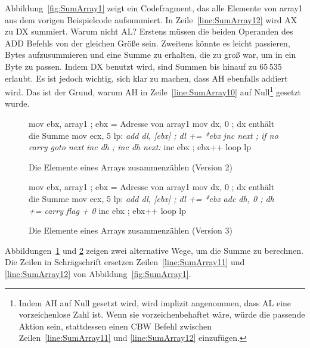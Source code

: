 Abbildung~\ref{fig:SumArray1} zeigt ein Codefragment, das alle
Elemente von {\code array1} aus dem vorigen Beispielcode
aufsummiert. In Zeile~\ref{line:SumArray12} wird AX zu DX summiert.
Warum nicht AL? Erstens m\"{u}ssen die beiden Operanden des {\code ADD}
Befehls von der gleichen Gr\"{o}{\ss}e sein. Zweitens k\"{o}nnte es leicht
passieren, Bytes aufzusummieren und eine Summe zu erhalten, die zu
gro{\ss} war, um in ein Byte zu passen. Indem DX benutzt wird, sind
Summen bis hinauf zu 65\,535 erlaubt. Es ist jedoch wichtig, sich
klar zu machen, dass AH ebenfalls addiert wird. Das ist der Grund,
warum AH in Zeile~\ref{line:SumArray10} auf Null\footnote{Indem AH
auf Null gesetzt wird, wird implizit angenommen, dass AL eine
vorzeichenlose Zahl ist. Wenn sie vorzeichenbehaftet w\"{a}re, w\"{u}rde die
passende Aktion sein, stattdessen einen {\code CBW} Befehl zwischen
Zeilen~\ref{line:SumArray11} und \ref{line:SumArray12} einzuf\"{u}gen.}
gesetzt wurde.

\begin{figure}[t]
\begin{AsmCodeListing}[frame=single, numbers=left, commandchars=\\\{\}]
      mov    ebx, array1      ; ebx = Adresse von array1
      mov    dx, 0            ; dx enth\"{a}lt die Summe
      mov    ecx, 5
 lp:
 \textit{     add    dl, [ebx]        ; dl += *ebx}
 \textit{     jnc    next             ; if no carry goto next}
 \textit{     inc    dh               ; inc dh}
 \textit{next:}
      inc    ebx              ; ebx++
      loop   lp
\end{AsmCodeListing}
\caption{Die Elemente eines Arrays zusammenz\"{a}hlen (Version 2)
\label{fig:SumArray2}}
\end{figure}

\begin{figure}[t]
\begin{AsmCodeListing}[frame=single, numbers=left, commandchars=\\\{\}]
      mov    ebx, array1      ; ebx = Adresse von array1
      mov    dx, 0            ; dx enth\"{a}lt die Summe
      mov    ecx, 5
 lp:
 \textit{     add    dl, [ebx]        ; dl += *ebx}
 \textit{     adc    dh, 0            ; dh += carry flag + 0}
      inc    ebx              ; ebx++
      loop   lp
\end{AsmCodeListing}
\caption{Die Elemente eines Arrays zusammenz\"{a}hlen (Version 3)
\label{fig:SumArray3}}
\end{figure}

Abbildungen~\ref{fig:SumArray2} und \ref{fig:SumArray3} zeigen zwei
alternative Wege, um die Summe zu berechnen. Die Zeilen in
Schr\"{a}gschrift ersetzen Zeilen~\ref{line:SumArray11} und
\ref{line:SumArray12} von Abbildung~\ref{fig:SumArray1}.

